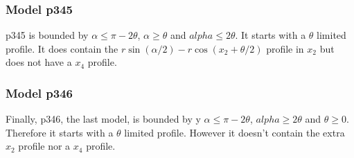 \subsubsection{Model p345} \label{p345}

p345 is bounded by $\alpha \le \pi - 2\theta$, $\alpha \ge \theta$ and $alpha \le 2\theta$. It starts with a $\theta$ limited profile. It does contain the $r\sin(\alpha/2) - r\cos(x_2 + \theta/2)$ profile in $x_2$ but does not have a $x_4$ profile.



\begin{comment}
\begin{figure}[t]
\centering
\texttt{[image: /home/tim/Dropbox/PhD/Analysis/REM-chapter/imgs/equalModelResults.pdf]}
\caption[REM model solutions]{The results of the models grouped so that all the regions with equal results are presented only once.}
\label{f:equalModelResults}
\end{figure}
\end{comment}

\subsubsection{Model p346} \label{p346}

Finally, p346, the last model, is bounded by y $\alpha \le \pi - 2\theta$, $alpha \ge 2\theta$ and $\theta \ge 0$. Therefore it starts with a $\theta$ limited profile. However it doesn't contain the extra $x_2$ profile nor a $x_4$ profile.








